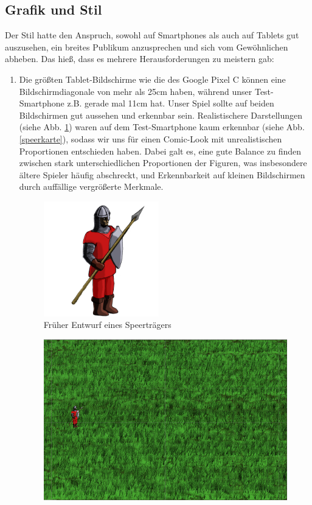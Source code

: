 \documentclass[extern,palatino]{cgBA}
\begin{document}
\subsection{Grafik und Stil}
Der Stil hatte den Anspruch, sowohl auf Smartphones als auch auf Tablets gut auszusehen, ein breites Publikum anzusprechen und sich vom Gewöhnlichen abheben. Das hieß, dass es mehrere Herausforderungen zu meistern gab:
\begin{enumerate}
	\item 
 Die größten Tablet-Bildschirme wie die des Google Pixel C können eine Bildschirmdiagonale von mehr als 25cm haben, während unser Test-Smartphone z.B. gerade mal 11cm hat. Unser Spiel sollte auf beiden Bildschirmen gut aussehen und erkennbar sein. Realistischere Darstellungen (siehe Abb. \ref{speerträger}) waren auf dem Test-Smartphone kaum erkennbar (siehe Abb. \ref{speerkarte}), sodass wir uns für einen Comic-Look mit unrealistischen Proportionen entschieden haben. Dabei galt es, eine gute Balance zu finden zwischen stark unterschiedlichen Proportionen der Figuren, was insbesondere ältere Spieler häufig abschreckt, und Erkennbarkeit auf kleinen Bildschirmen durch auffällige vergrößerte Merkmale.
\begin{figure}[H]
		\centering
		\includegraphics[height=5cm]{soldier.png}
		\caption{Früher Entwurf eines Speerträgers}
		\label{speerträger}
\end{figure}
\begin{figure}[H]
		\centering
		\includegraphics[width=13cm]{soldierbackground.png}

\end{figure}
\end{enumerate}
\end{document}
